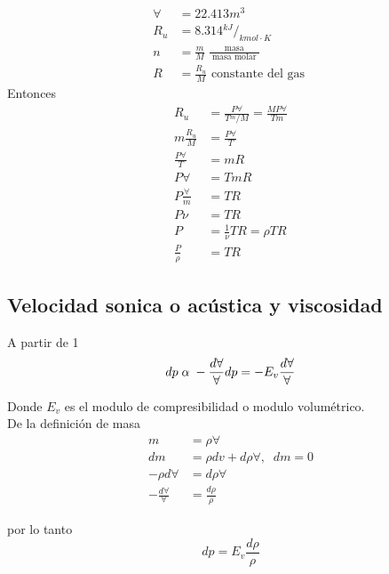 \begin{enumerate}
\[\begin{split}
                \forall & = 22.413 m^{3} \\
                R_{u} & = 8.314 {}^{kJ}/_{kmol \cdot K} \\
                n & = \frac{ m }{ M } \; \frac{ \text{ masa } }{ \text{ masa molar } } \\
                R & = \frac{ R_{u} }{ M } \text{ constante del gas }
            \end{split}
        \]
        Entonces 
        \[
            \begin{split}
                R_{u} & = \frac{ P \forall }{ T {}^{m}/{M} } = \frac{ MP \forall }{ Tm } \\
                m \frac{ R_{u} }{ M } & = \frac{ P \forall }{ T } \\
                \frac{ P \forall }{ T } & = mR \\
                P \forall & = TmR \\
                P \frac{ \forall }{ m } & = TR \\
                P \nu & = TR \\
                P & = \frac{ 1 }{ \nu } TR = \rho TR \\
                \frac{ P }{ \rho } & = TR
            \end{split}
        \]
\end{enumerate}

\subsection{ Velocidad sonica o acústica y viscosidad }

A partir de 1
\[
    dp \; \alpha \; - \frac{ d \forall }{ \forall } \\
    dp = -E_{v} \frac{ d \forall }{ \forall }
\]

Donde \( E_{v} \) es el modulo de compresibilidad o modulo volumétrico. \\ 
De la definición de masa
\[
    \begin{split}
        m & = \rho \forall \\
        dm & = \rho dv + d\rho \forall, \;\; dm = 0 \\
        -\rho d\forall & = d\rho \forall \\
        - \frac{ d \forall }{ \forall } & = \frac{ d\rho }{ \rho }
    \end{split}
\]

por lo tanto
\[
    dp = E_{v} \frac{ d\rho }{ \rho }
\]

